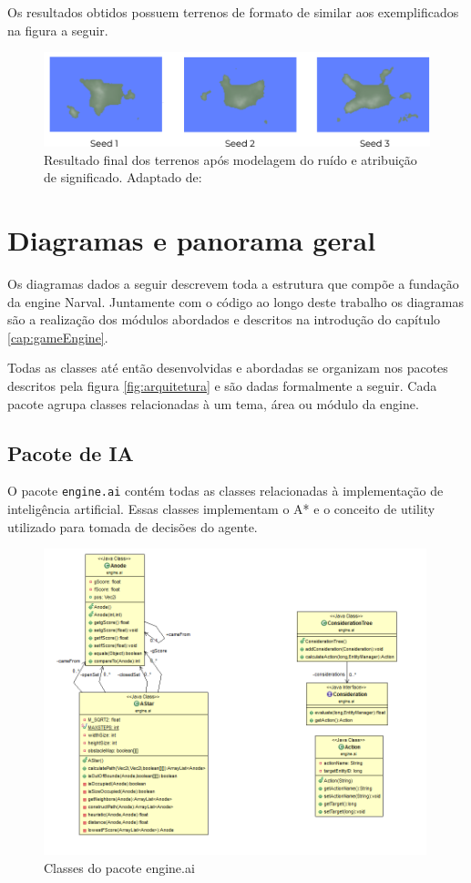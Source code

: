 \documentclass[12pt, 
openright, 
oneside, 
a4paper,    
brazil]{facom-ufu-abntex2}
\begin{document}
Os resultados obtidos possuem terrenos de formato de similar aos exemplificados na figura a seguir.

\begin{figure}[H]
	\centering
	\includegraphics[width=34em]{imagens/generatedTerrains.png}
	\caption{Resultado final dos terrenos após modelagem do ruído e atribuição de significado. Adaptado de: \cite{NoiseRedBlob}}
\end{figure}


\chapter{Diagramas e panorama geral}
\label{cap:panoramaGeral}

Os diagramas dados a seguir descrevem toda a estrutura que compõe a fundação da engine Narval. Juntamente com o código ao longo deste trabalho os diagramas são a realização dos módulos abordados e descritos na introdução do capítulo \ref{cap:gameEngine}.

Todas as classes até então desenvolvidas e abordadas se organizam nos pacotes descritos pela figura \ref{fig:arquitetura} e são dadas formalmente a seguir. Cada pacote agrupa classes relacionadas à um tema, área ou módulo da engine.

\section{Pacote de IA}

O pacote \texttt{engine.ai} contém todas as classes relacionadas à implementação de inteligência artificial. Essas classes implementam o A* e o conceito de utility utilizado para tomada de decisões do agente.

\begin{figure}[H]
	\centering
	\includegraphics[width=30em]{imagens/engine.ai.png}
	\caption{Classes do pacote engine.ai}
\end{figure}
\end{document}
